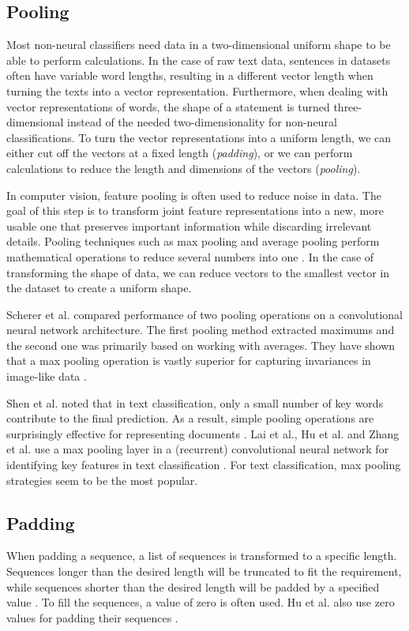 \subsection{Pooling}
Most non-neural classifiers need data in a two-dimensional uniform shape to be able to perform calculations. 
In the case of raw text data, sentences in datasets often have variable word lengths, resulting in a different vector length when turning the texts into a vector representation.
Furthermore, when dealing with vector representations of words, the shape of a statement is turned three-dimensional instead of the needed two-dimensionality for non-neural classifications.
To turn the vector representations into a uniform length, we can either cut off the vectors at a fixed length (\textit{padding}), or we can perform calculations to reduce the length and dimensions of the vectors (\textit{pooling}).

In computer vision, feature pooling is often used to reduce noise in data. 
The goal of this step is to transform joint feature representations into a new, more usable one that preserves important information while discarding irrelevant details.
Pooling techniques such as max pooling and average pooling perform mathematical operations to reduce several numbers into one \cite{boureau2010}. 
In the case of transforming the shape of data, we can reduce vectors to the smallest vector in the dataset to create a uniform shape.

Scherer et al. compared performance of two pooling operations on a convolutional neural network architecture. 
The first pooling method extracted maximums and the second one was primarily based on working with averages.
They have shown that a max pooling operation is vastly superior for capturing invariances in image-like data \cite{scherer2010}.

Shen et al. noted that in text classification, only a small number of key words contribute to the final prediction.
As a result, simple pooling operations are surprisingly effective for representing documents \cite{shen2018}.  
Lai et al., Hu et al. and Zhang et al. use a max pooling layer in a (recurrent) convolutional neural network for identifying key features in text classification \cite{lai2015}\cite{hu2014}\cite{zhang2015}. 
For text classification, max pooling strategies seem to be the most popular. 

\subsection{Padding}
When padding a sequence, a list of sequences is transformed to a specific length. 
Sequences longer than the desired length will be truncated to fit the requirement, while sequences shorter than the desired length will be padded by a specified value \cite{keraspad}. 
To fill the sequences, a value of zero is often used. Hu et al. also use zero values for padding their sequences \cite{hu2014}. 

